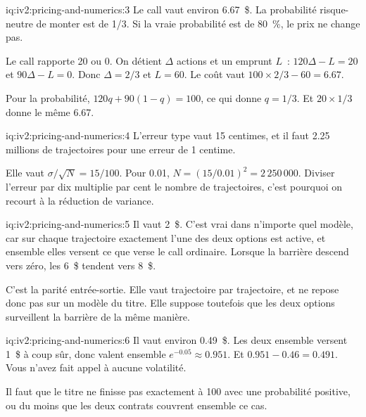 \begin{solution}{iq:iv2:pricing-and-numerics:3}
Le call vaut environ 6.67~\$. La probabilité risque-neutre de monter est de 1/3. Si la vraie probabilité est de 80~\%, le prix ne change pas.

Le call rapporte 20 ou 0. On détient $\Delta$ actions et un emprunt $L$~: $120\Delta - L = 20$ et $90\Delta - L = 0$. Donc $\Delta = 2/3$ et $L = 60$. Le coût vaut $100 \times 2/3 - 60 = 6.67$.

Pour la probabilité, $120q + 90(1 - q) = 100$, ce qui donne $q = 1/3$. Et $20 \times 1/3$ donne le même 6.67.

\end{solution}

\begin{solution}{iq:iv2:pricing-and-numerics:4}
L'erreur type vaut 15 centimes, et il faut 2.25 millions de trajectoires pour une erreur de 1 centime.

Elle vaut $\sigma/\sqrt N = 15/100$. Pour 0.01, $N = (15/0.01)^2 = 2\,250\,000$. Diviser l'erreur par dix multiplie par cent le nombre de trajectoires, c'est pourquoi on recourt à la réduction de variance.

\end{solution}

\begin{solution}{iq:iv2:pricing-and-numerics:5}
Il vaut 2~\$. C'est vrai dans n'importe quel modèle, car sur chaque trajectoire exactement l'une des deux options est active, et ensemble elles versent ce que verse le call ordinaire. Lorsque la barrière descend vers zéro, les 6~\$ tendent vers 8~\$.

C'est la parité entrée-sortie. Elle vaut trajectoire par trajectoire, et ne repose donc pas sur un modèle du titre. Elle suppose toutefois que les deux options surveillent la barrière de la même manière.

\end{solution}

\begin{solution}{iq:iv2:pricing-and-numerics:6}
Il vaut environ 0.49~\$. Les deux ensemble versent 1~\$ à coup sûr, donc valent ensemble $e^{-0.05} \approx 0.951$. Et $0.951 - 0.46 = 0.491$. Vous n'avez fait appel à aucune volatilité.

Il faut que le titre ne finisse pas exactement à 100 avec une probabilité positive, ou du moins que les deux contrats couvrent ensemble ce cas.

\end{solution}

